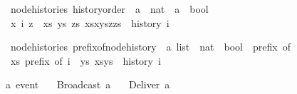\documentclass[acmlarge,review,anonymous]{acmart}\settopmatter{printfolios=true}
\begin{document}
\begin{isabellebody}
\isanewline
{}\isamarkupfalse%
\ {\isacharparenleft}\ node{\isacharunderscore}histories{\isacharparenright}\ history{\isacharunderscore}order\ {\isacharcolon}{\isacharcolon}\ {\isachardoublequoteopen}{\isacharprime}a\ {\isasymRightarrow}\ nat\ {\isasymRightarrow}\ {\isacharprime}a\ {\isasymRightarrow}\ bool{\isachardoublequoteclose}\ {\isacharparenleft}{\isachardoublequoteopen}{\isacharunderscore}{\isacharslash}\ {\isasymsqsubset}\isactrlsup {\isacharunderscore}{\isacharslash}\ {\isacharunderscore}{\isachardoublequoteclose}\ {\isacharbrackleft}{}{}{\isacharcomma}{}{}{}{}{\isacharcomma}{}{}{\isacharbrackright}{}{}{\isacharparenright}\ \isanewline
\ \ {\isachardoublequoteopen}x\ {\isasymsqsubset}\isactrlsup i\ z\ {\isasymequiv}\ {\isasymexists}xs\ ys\ zs{\isachardot}\ xs{\isacharat}x{\isacharhash}ys{\isacharat}z{\isacharhash}zs\ {\isacharequal}\ history\ i{\isachardoublequoteclose}\isanewline
\end{isabellebody}

\begin{isabellebody}
\isanewline
{}\isamarkupfalse%
\ {\isacharparenleft}\ node{\isacharunderscore}histories{\isacharparenright}\ prefix{\isacharunderscore}of{\isacharunderscore}node{\isacharunderscore}history\ {\isacharcolon}{\isacharcolon}\ {\isachardoublequoteopen}{\isacharprime}a\ list\ {\isasymRightarrow}\ nat\ {\isasymRightarrow}\ bool{\isachardoublequoteclose}\ {\isacharparenleft}\ {\isachardoublequoteopen}prefix\ of{\isachardoublequoteclose}\ {}{}{\isacharparenright}\ \isanewline
\ \ {\isachardoublequoteopen}xs\ prefix\ of\ i\ {\isasymequiv}\ {\isasymexists}ys{\isachardot}\ xs{\isacharat}ys\ {\isacharequal}\ history\ i{\isachardoublequoteclose}\isanewline
\isanewline
\end{isabellebody}

\begin{isabellebody}
\isanewline
{}\isamarkupfalse%
\ {\isacharprime}a\ event\isanewline
\ \ {\isacharequal}\ Broadcast\ {\isacharprime}a\isanewline
\ \ {\isacharbar}\ Deliver\ {\isacharprime}a\isanewline
\isanewline
\end{isabellebody}
\end{document}
